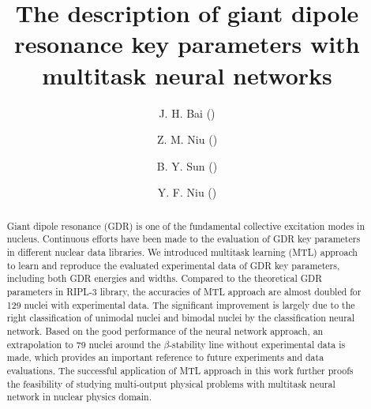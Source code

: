 \documentclass[twocolumn,showpacs,superscriptaddress,amsmath,amssymb,prc,preprintnumbers]{revtex4-1}
\begin{document}
\begin{CJK*}{UTF8}{}

\title{The description of giant dipole resonance key parameters with multitask neural networks}

\author{J. H. Bai ()}

\author{Z. M. Niu ()}

\author{B. Y. Sun ()}

\author{Y. F. Niu ()}

\begin{abstract}
Giant dipole resonance (GDR) is one of the fundamental collective excitation modes in nucleus. Continuous efforts have been made to the evaluation of GDR key parameters in different nuclear data libraries.
We introduced multitask learning (MTL) approach to learn and reproduce the evaluated experimental data of GDR key parameters,  including both GDR energies and widths. Compared to the theoretical GDR parameters in RIPL-3 library, the accuracies of MTL approach are almost doubled for 129 nuclei with experimental data. The significant improvement is largely due to the right classification of unimodal nuclei and bimodal nuclei by the classification neural network.  Based on the good performance of the neural network approach, an extrapolation to 79 nuclei around the $\beta$-stability line without experimental data is made, which provides an important reference to future experiments and data evaluations. The successful application of MTL approach in this work further proofs the feasibility of studying multi-output physical problems with multitask neural network in nuclear physics domain.
\end{abstract}
%
%
\maketitle
\end{CJK*}
\end{document}
